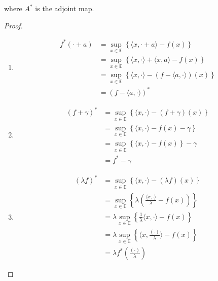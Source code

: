 \documentclass{tufte-handout}
\begin{document}
{\begin{proposition}
\begin{enumerate}
    where $A^*$ is the adjoint map. 
  \end{enumerate}
  \begin{proof} $  $
    \begin{enumerate}
    \item   
    \begin{equation*}
      \begin{split}
        f^*(\cdot + a) &= \sup_{x \in \mathbb{E}} \left\{ \langle x, \cdot + a \rangle - f(x) \right\} \\ 
        &= \sup_{x \in \mathbb{E}} \left\{ \langle x, \cdot \rangle + \langle x, a \rangle - f(x) \right\}\\ 
        &= \sup_{x \in \mathbb{E}} \left\{ \langle x, \cdot \rangle - (f- \langle a, \cdot \rangle )(x)\right\}\\ 
        &= (f-\langle a, \cdot \rangle)^*
      \end{split}
    \end{equation*}
  
  \item   
    \begin{equation*}
      \begin{split}
        (f+ \gamma)^* &= \sup_{x \in \mathbb{E}} \left\{ \langle x, \cdot \rangle - (f+ \gamma)(x) \right\}\\ 
        &= \sup_{x \in \mathbb{E}} \left\{ \langle x, \cdot \rangle - f(x) - \gamma \right\}\\
        &= \sup_{x \in \mathbb{E}} \left\{ \langle x, \cdot \rangle - f(x)\right\} - \gamma\\
        &= f^* - \gamma
     \end{split}
    \end{equation*}
  \item  \begin{equation*}
    \begin{split}
      (\lambda f)^* &= \sup_{x \in \mathbb{E}} \left\{ \langle x, \cdot \rangle - (\lambda f)(x)\right\} \\ 
      &= \sup_{x \in \mathbb{E}} \left\{ \lambda \left(\frac{\langle x, \cdot \rangle}{\lambda} - f(x)\right)\right\} \\ 
      &=  \lambda \sup_{x \in \mathbb{E}} \left\{ \frac{1}{\lambda}\langle x, \cdot \rangle - f(x)\right\} \\ 
      &= \lambda \sup_{x \in \mathbb{E}} \left\{ \langle x, \frac{(\cdot) }{\lambda} \rangle - f(x)\right\} \\ 
      &= \lambda f^{*}\left(\frac{(\cdot)}{\lambda}\right)
    \end{split}
  \end{equation*}
    

\end{enumerate}
\end{proof}
\end{proposition}}
\end{document}
